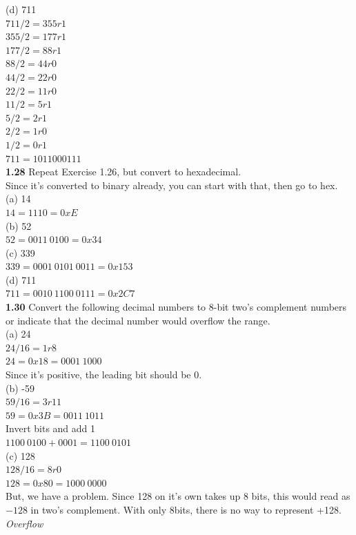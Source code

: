 \documentclass[12pt,a4paper]{report}
\begin{document}
\begin{normalsize}
(d) 711 \\
$ 711/2 = 355 r 1 $ \\
$ 355/2 = 177 r 1 $ \\
$ 177/2 = 88 r 1 $ \\
$ 88/2 = 44 r 0 $ \\
$ 44/2 = 22 r 0 $ \\
$ 22/2 = 11 r 0 $ \\
$ 11/2 = 5 r 1 $ \\
$ 5/2 = 2 r 1 $ \\
$ 2/2 = 1 r 0 $ \\
$ 1/2 = 0 r 1 $ \\
$ 711 = 1011000111 $ \\ 

\textbf{1.28} Repeat Exercise 1.26, but convert to hexadecimal. \\
Since it's converted to binary already, you can start with that, then go to hex. \\
(a) 14 \\
$ 14 = 1110 = 0xE $ \\

(b) 52 \\
$ 52 = 0011\: 0100 = 0x34$ \\

(c) 339 \\
$ 339 = 0001\: 0101\: 0011 = 0x153 $\\

(d) 711 \\
$ 711 = 0010\: 1100\: 0111 = 0x2C7 $ \\

\textbf{1.30} Convert the following decimal numbers to 8-bit two's complement numbers or indicate that the decimal number would overflow the range. \\
(a) 24 \\
$ 24/16 = 1r8 $ \\
$ 24 = 0x18 = 0001\: 1000 $ \\
Since it's positive, the leading bit should be 0. \\

(b) -59 \\
$ 59/16 = 3r11 $ \\
$ 59 = 0x3B = 0011\: 1011 $ \\
Invert bits and add 1 \\
$ 1100\: 0100 + 0001 = 1100\: 0101 $ \\

(c) 128 \\
$ 128/16 = 8r0 $ \\
$ 128 = 0x80 = 1000\: 0000 $ \\
But, we have a problem. Since 128 on it's own takes up 8 bits, this would read as $ -128 $ in two's complement. With only 8bits, there is no way to represent +128. \emph{Overflow} \\


\end{normalsize}
\end{document}

